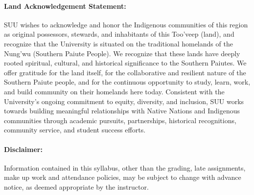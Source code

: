\documentclass[12pt, letterpaper]{article}
\begin{document}
\paragraph{Land Acknowledgement Statement:}
SUU wishes to acknowledge and honor the Indigenous communities of this region as original possessors, stewards, and inhabitants of this Too’veep (land), and recognize that the University is situated on the traditional homelands of the Nung’wu (Southern Paiute People). We recognize that these lands have deeply rooted spiritual, cultural, and historical significance to the Southern Paiutes. We offer gratitude for the land itself, for the collaborative and resilient nature of the Southern Paiute people, and for the continuous opportunity to study, learn, work, and build community on their homelands here today. Consistent with the University's ongoing commitment to equity, diversity, and inclusion, SUU works towards building meaningful relationships with Native Nations and Indigenous communities through academic pursuits, partnerships, historical recognitions, community service, and student success efforts.

\paragraph{Disclaimer:}
Information contained in this syllabus, other than the grading, late assignments, make up work and attendance policies, may be subject to change with advance notice, as deemed appropriate by the instructor.
\end{document}
